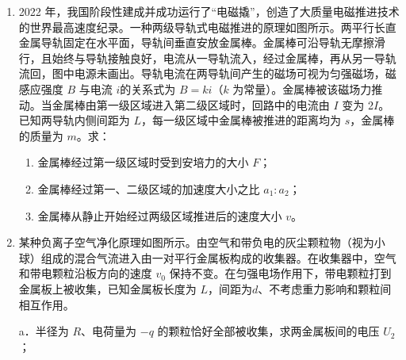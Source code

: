 \documentclass[\gkver]{gaokaozhenti}
\begin{document}
\begin{enumerate}
\item
2022 年，我国阶段性建成并成功运行了“电磁撬”，创造了大质量电磁推进技术的世界最高速度纪录。一种两级导轨式电磁推进的原理如图所示。两平行长直金属导轨固定在水平面，导轨间垂直安放金属棒。金属棒可沿导轨无摩擦滑行，且始终与导轨接触良好，电流从一导轨流入，经过金属棒，再从另一导轨流回，图中电源未画出。导轨电流在两导轨间产生的磁场可视为匀强磁场，磁感应强度 $B$ 与电流 $i $的关系式为 $B = ki$（$k$ 为常量）。金属棒被该磁场力推动。当金属棒由第一级区域进入第二级区域时，回路中的电流由 $I$ 变为 2$I$。已知两导轨内侧间距为 $L$，每一级区域中金属棒被推进的距离均为 $s$，金属棒的质量为 $m$。求：
\begin{enumerate}
	\item
	金属棒经过第一级区域时受到安培力的大小 $F$；
	\item
	金属棒经过第一、二级区域的加速度大小之比 $a_{1}:a_{2}$；
	\item
	金属棒从静止开始经过两级区域推进后的速度大小 $v$。
\end{enumerate}

\item
某种负离子空气净化原理如图所示。由空气和带负电的灰尘颗粒物（视为小球）组成的混合气流进入由一对平行金属板构成的收集器。在收集器中，空气和带电颗粒沿板方向的速度 $v_{0}$ 保持不变。在匀强电场作用下，带电颗粒打到金属板上被收集，已知金属板长度为 $L$，间距为$d$、不考虑重力影响和颗粒间相互作用。

a．半径为 $R$、电荷量为 $- q$ 的颗粒恰好全部被收集，求两金属板间的电压 $U_{2}$；


\end{enumerate}
\end{document}
